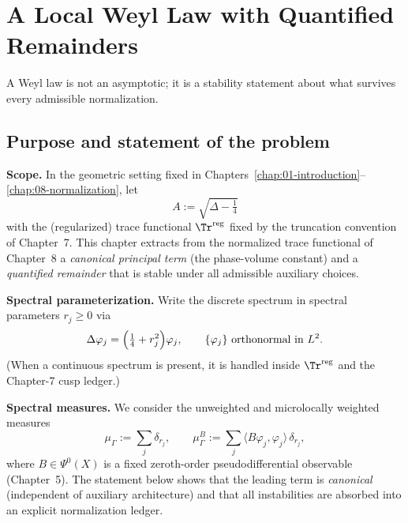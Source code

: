 
\chapter{A Local Weyl Law with Quantified Remainders}
\label{chap:09-local-weyl}

\epigraph{A Weyl law is not an asymptotic; it is a stability statement about what survives every admissible normalization.}{}

\section{Purpose and statement of the problem}
\label{sec:09.purpose}

\noindent\textbf{Scope.}
In the geometric setting fixed in Chapters~\ref{chap:01-introduction}--\ref{chap:08-normalization}, let
\[
A:=\sqrt{\Delta-\tfrac14}
\]
with the (regularized) trace functional $\Tr^{\mathrm{reg}}$ fixed by the truncation convention of Chapter~7.
This chapter extracts from the normalized trace functional of Chapter~8 a \emph{canonical principal term}
(the phase-volume constant) and a \emph{quantified remainder} that is stable under all admissible auxiliary choices.

\medskip
\noindent\textbf{Spectral parameterization.}
Write the discrete spectrum in spectral parameters $r_j\ge 0$ via
\[
\Delta\varphi_j=\Bigl(\tfrac14+r_j^2\Bigr)\varphi_j,
\qquad \{\varphi_j\}\ \text{orthonormal in }L^2.
\]
(When a continuous spectrum is present, it is handled inside $\Tr^{\mathrm{reg}}$ and the Chapter-7 cusp ledger.)

\medskip
\noindent\textbf{Spectral measures.}
We consider the unweighted and microlocally weighted measures
\begin{equation}\label{eq:09.measures}
\mu_\Gamma := \sum_j \delta_{r_j},
\qquad
\mu_\Gamma^{B} := \sum_j \langle B\varphi_j,\varphi_j\rangle\,\delta_{r_j},
\end{equation}
where $B\in\Psi^0(X)$ is a fixed zeroth-order pseudodifferential observable (Chapter~5).
The statement below shows that the leading term is \emph{canonical} (independent of auxiliary architecture)
and that all instabilities are absorbed into an explicit normalization ledger.

